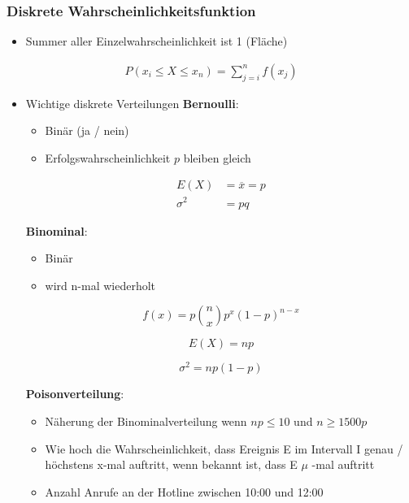 \documentclass[11pt,twoside,landscape]{article}
\begin{document}
\begin{multicols}{3}
\subsubsection*{Diskrete Wahrscheinlichkeitsfunktion}
\label{sec:org7311785}
\begin{itemize}
\item Summer aller Einzelwahrscheinlichkeit ist 1 (Fläche)
\end{itemize}
\begin{align*}
P(x_i \leq X \leq x_n) = \sum_{j=i}^{n} f(x_j)
\end{align*}

\begin{itemize}
\item Wichtige diskrete Verteilungen
\label{sec:orgc6d0ed8}
\textbf{Bernoulli}:
\begin{itemize}
\item Binär (ja / nein)
\item Erfolgswahrscheinlichkeit \(p\) bleiben gleich
\end{itemize}
\begin{align*}
E(X) &= \overline{x} = p \\
\sigma^2 &= pq
\end{align*}

\textbf{Binominal}:
\begin{itemize}
\item Binär
\item wird n-mal wiederholt
\end{itemize}
\begin{equation*}
f(x) = p\binom{n}{x}p^x(1-p)^{n-x}
\end{equation*}

\begin{equation*}
E(X) = np
\end{equation*}

\begin{equation*}
\sigma^2 = np(1-p)
\end{equation*}

\textbf{Poisonverteilung}:
\begin{itemize}
\item Näherung der Binominalverteilung wenn \(np \leq 10\) und \(n \geq 1500p\)
\item Wie hoch die Wahrscheinlichkeit, dass Ereignis E im Intervall I genau / höchstens x-mal auftritt, wenn bekannt ist, dass E \(\mu\) -mal auftritt
\item Anzahl Anrufe an der Hotline zwischen 10:00 und 12:00
\end{itemize}


\end{itemize}
\end{multicols}
\end{document}
